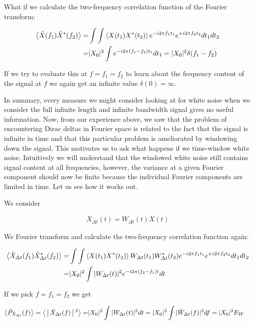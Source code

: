 \documentclass[12pt]{article}
\begin{document}
What if we calculate the two-frequency correlation function of the Fourier transform:

\begin{align}
\Braket{\tilde{X}(f_1)\tilde{X}^*(f_2)} =& \int \int \Braket{X(t_1)X^*(t_2)} e^{-i2\pi f_1 t_1}e^{+i2\pi f_2 t_2} dt_1 dt_2\\
=& |X_0|^2 \int e^{-i2\pi (f_1-f_2) t_1} dt_1 = |X_0|^2 \delta(f_1-f_2)
\end{align}

If we try to evaluate this at $f=f_1=f_2$ to learn about the frequency content of the signal at $f$ we again get an infinite value $\delta(0) = \infty$.

In summary, every measure we might consider looking at for white noise when we consider the full infinite length and infinite bandwidth signal gives no useful information.
Now, from our experience above, we saw that the problem of encountering Dirac deltas in Fourier space is related to the fact that the signal is infinite in time and that this particular problem is ameliorated by windowing down the signal.
This motivates us to ask what happens if we time-window white noise.
Intuitively we will understand that the windowed white noise still contains signal content at all frequencies, however, the variance at a given Fourier component should now be finite because the individual Fourier components are limited in time.
Let us see how it works out.

We consider

\begin{align}
X_{\Delta t}(t) = W_{\Delta t}(t)X(t)
\end{align}

We Fourier transform and calculate the two-frequency correlation function again:

\begin{align}
\Braket{\tilde{X}_{\Delta t}(f_1)\tilde{X}_{\Delta t}^*(f_2)} =& \int \int \Braket{X(t_1)X^*(t_2)}W_{\Delta t}(t_1)W^*_{\Delta t}(t_2) e^{-i2\pi f_1 t_1}e^{+i2\pi f_2 t_2} dt_1 dt_2\\
=& |X_0|^2\int |W_{\Delta t}(t)|^2 e^{-i 2\pi (f_2-f_1) t} dt
\end{align}

If we pick $f=f_1=f_2$ we get

\begin{align}
\Braket{\tilde{P}_{X_{\Delta t}}(f)} = \Braket{|\tilde{X}_{\Delta t}(f)|^2} =& |X_0|^2\int |W_{\Delta t}(t)|^2 dt = |X_0|^2\int |\tilde{W}_{\Delta t}(f)|^2 df = |X_0|^2E_W
\end{align}
\end{document}

